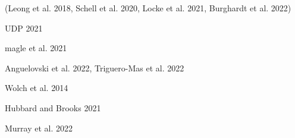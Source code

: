 \documentclass[12pt,a4paper]{article}
\begin{document}
(Leong et al. 2018, Schell et al. 2020, Locke et al. 2021, Burghardt et al. 2022) 
\cite{leong2018biodiversity,schell2020ecological,locke2021residential,burghardt2023current}

UDP 2021
\cite{udp2021}

magle et al. 2021
\cite{magle2021wealth}

Anguelovski et al. 2022, Triguero-Mas et al. 2022
\cite{anguelovski2022green,triguero2022exploring}

Wolch et al. 2014
\cite{wolch2014urban}

Hubbard and Brooks 2021 \cite{hubbard2021animals}

Murray et al. 2022 \cite{murray2022one}




\end{document}

